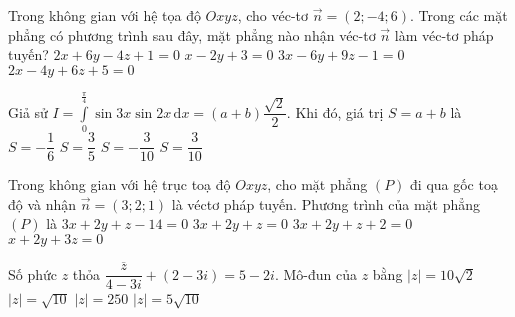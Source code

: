 \begin{ex}%
	Trong không gian với hệ tọa độ $Oxyz$, cho véc-tơ $\overrightarrow{n}=(2;-4;6)$. Trong các mặt phẳng có phương trình sau đây, mặt phẳng nào nhận véc-tơ $\overrightarrow{n}$ làm véc-tơ pháp tuyến?
	\choice
	{$2x+6y-4z+1=0$}
	{$x-2y+3=0$}
	{$3x-6y+9z-1=0$}
	{\True $2x-4y+6z+5=0$}
\end{ex}
\begin{ex}%
	Giả sử $I=\displaystyle\int\limits_0^{\tfrac{\pi}{4}}\sin3x\sin2x\mathrm{\,d}x=(a+b)\dfrac{\sqrt{2}}{2}$. Khi đó, giá trị $S=a+b$ là
	\choice
	{$S=-\dfrac{1}{6}$}
	{\True $S=\dfrac{3}{5}$}
	{$S=-\dfrac{3}{10}$}
	{$S=\dfrac{3}{10}$}
\end{ex}
\begin{ex}%
	Trong không gian với hệ trục toạ độ $Oxyz$, cho mặt phẳng $(P)$ đi qua gốc toạ độ và nhận $\overrightarrow{n}=(3;2;1)$ là véctơ pháp tuyến. Phương trình của mặt phẳng $(P)$ là
	\choice
	{$3x+2y+z-14=0$}
	{\True $3x+2y+z=0$}
	{$3x+2y+z+2=0$}
	{$x+2y+3z=0$}
\end{ex}
\begin{ex}%
	Số phức $z$ thỏa $\dfrac{\overline{z}}{4-3i}+(2-3i)=5-2i$. Mô-đun của $z$ bằng
	\choice
	{$|z|=10\sqrt{2}$}
	{$|z|=\sqrt{10}$}
	{$|z|=250$}
	{\True $|z|=5\sqrt{10}$}
\end{ex}
